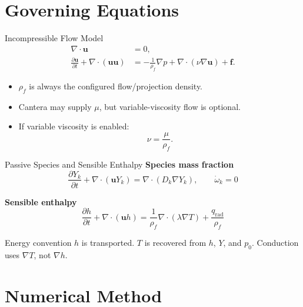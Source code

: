 \documentclass[aspectratio=169,11pt]{beamer}
\begin{document}
\section{Governing Equations}

\begin{frame}{Incompressible Flow Model}
  \begin{align*}
    \nabla \cdot \mathbf{u} &= 0, \\
    \frac{\partial \mathbf{u}}{\partial t}
    +
    \nabla \cdot (\mathbf{u}\mathbf{u})
    &=
    -\frac{1}{\rho_f}\nabla p
    +
    \nabla \cdot (\nu\nabla \mathbf{u})
    +
    \mathbf{f}.
  \end{align*}

  \begin{itemize}
    \item \(\rho_f\) is always the configured flow/projection density.
    \item Cantera may supply \(\mu\), but variable-viscosity flow is optional.
    \item If variable viscosity is enabled:
          \[
            \nu = \frac{\mu}{\rho_f}.
          \]
  \end{itemize}
\end{frame}

\begin{frame}{Passive Species and Sensible Enthalpy}
  \textbf{Species mass fraction}
  \[
    \frac{\partial Y_k}{\partial t}
    +
    \nabla \cdot (\mathbf{u}Y_k)
    =
    \nabla \cdot (D_k\nabla Y_k),
    \qquad
    \dot{\omega}_k = 0
  \]

  \vspace{1em}
  \textbf{Sensible enthalpy}
  \[
    \frac{\partial h}{\partial t}
    +
    \nabla \cdot (\mathbf{u}h)
    =
    \frac{1}{\rho_f}\nabla \cdot (\lambda\nabla T)
    +
    \frac{q_{\mathrm{rad}}}{\rho_f}
  \]

  \begin{alertblock}{Energy convention}
    \(h\) is transported. \(T\) is recovered from \(h\), \(Y\), and \(p_0\).
    Conduction uses \(\nabla T\), not \(\nabla h\).
  \end{alertblock}
\end{frame}

\section{Numerical Method}
\end{document}
